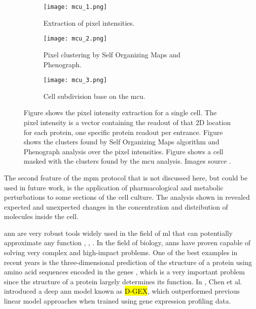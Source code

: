 \begin{figure}[htb]
  \centering
  \begin{subfigure}[t]{.3\linewidth}
    \texttt{[image: mcu\_1.png]}
    \caption{Extraction of pixel intensities.}
    \label{fig:mcu:1}
  \end{subfigure}
  \hspace{4mm}
  \begin{subfigure}[t]{.3\linewidth}
    \texttt{[image: mcu\_2.png]}
    \caption{Pixel clustering by Self Organizing Maps and Phenograph.}
    \label{fig:mcu:2}
  \end{subfigure}
  \hspace{4mm}
  \begin{subfigure}[t]{.3\linewidth}
    \texttt{[image: mcu\_3.png]}
    \caption{Cell subdivision base on the \gls{mcu}.}
    \label{fig:mcu:3}
  \end{subfigure}
  \caption{Figure  shows the pixel intensity extraction for a single cell. The pixel intensity is a vector containing the readout of that 2D location for each protein, one specific protein readout per entrance. Figure  shows the clusters found by Self Organizing Maps algorithm and Phenograph analysis over the pixel intensities. Figure  shows a cell masked with the clusters found by the \gls{mcu} analysis. Images source \cite{Guteaar7042}.}
  \label{fig:mcu}
\end{figure}

The second feature of the \gls{mpm} protocol that is not discussed here, but could be used in future work, is the application of pharmacological and metabolic perturbations to some sections of the cell culture. The analysis shown in \cite{Guteaar7042} revealed expected and unexpected changes in the concentration and distribution of molecules inside the cell.

\gls{ann} are very robust tools widely used in the field of \gls{ml} that can potentially approximate any function \cite{cybenko1989approximation}, \cite{hornik1989multilayer}, \cite{funahashi1989approximate}.
In the field of biology, \glspl{ann} have proven capable of solving very complex and high-impact problems.
One of the best examples in recent years is the three-dimensional prediction of the structure of a protein using amino acid sequences encoded in the genes \cite{AlphaFold}, which is a very important problem since the structure of a protein largely determines its function. In \cite{chen2016gene}, Chen et al. introduced a deep \gls{ann} model known as \hl{D-GEX}, which outperformed previous linear model approaches when trained using gene expression profiling data.

